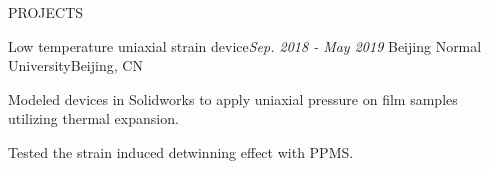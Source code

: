 \documentclass{resume} %
\begin{document}
\begin{rSection}{PROJECTS}
\begin{rSubsection}
{Low temperature uniaxial strain device}{\em Sep. 2018 - May 2019}
{Beijing Normal University}{Beijing, CN}
\item Modeled devices in Solidworks to apply uniaxial pressure on film samples utilizing thermal expansion.
\item Tested the strain induced detwinning effect with PPMS.
\end{rSubsection}

\end{rSection}










\end{document}
